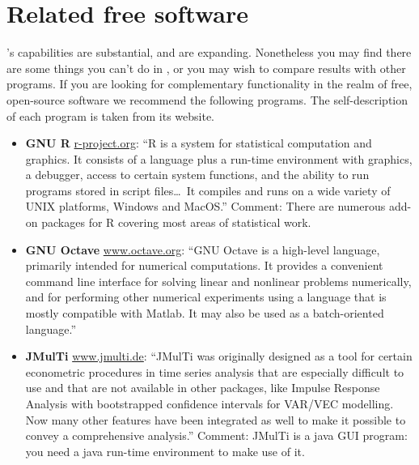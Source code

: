 \chapter{Related free software}
\label{app-advanced}

's capabilities are substantial, and are expanding.
Nonetheless you may find there are some things you can't do in
, or you may wish to compare results with other programs.
If you are looking for complementary functionality in the realm of
free, open-source software we recommend the following programs.  The
self-description of each program is taken from its website.

\begin{itemize}

\item \textbf{GNU R} \href{http://www.r-project.org/}{r-project.org}:
  ``R is a system for statistical computation and graphics. It
  consists of a language plus a run-time environment with graphics, a
  debugger, access to certain system functions, and the ability to run
  programs stored in script files\dots\ It compiles and runs on a wide
  variety of UNIX platforms, Windows and MacOS.''  Comment: There are
  numerous add-on packages for R covering most areas of statistical
  work.

\item \textbf{GNU Octave}
  \href{http://www.octave.org/}{www.octave.org}:
  ``GNU Octave is a high-level language, primarily intended for
  numerical computations. It provides a convenient command line
  interface for solving linear and nonlinear problems numerically, and
  for performing other numerical experiments using a language that is
  mostly compatible with Matlab. It may also be used as a
  batch-oriented language.''

\item \textbf{JMulTi} \href{http://www.jmulti.de/}{www.jmulti.de}:
  ``JMulTi was originally designed as a tool for certain econometric
  procedures in time series analysis that are especially difficult to
  use and that are not available in other packages, like Impulse
  Response Analysis with bootstrapped confidence intervals for VAR/VEC
  modelling. Now many other features have been integrated as well to
  make it possible to convey a comprehensive analysis.''  Comment:
  JMulTi is a java GUI program: you need a java run-time environment to
  make use of it.

\end{itemize}

